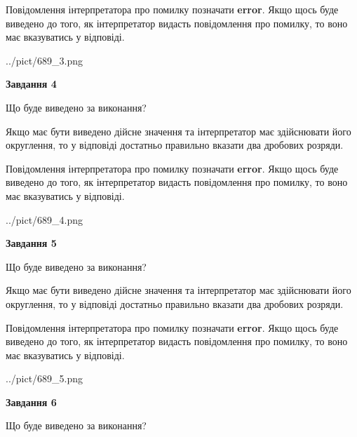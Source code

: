 \documentclass[12pt, ukrainian]{article}
\begin{document}
{\begin {Large}
Повідомлення інтерпретатора про помилку позначати \textbf{error}.
Якщо щось буде виведено до того, як інтерпретатор видасть повідомлення про помилку, 
то воно має вказуватись у відповіді. \par

\begin{center}
	{../pict/689_3.png}
\end{center}
\newpage

{\begin {center}\textbf{Завдання 4}\end {center}}\par
Що буде виведено за виконання? \par

Якщо має бути виведено дійсне значення та інтерпретатор має здійснювати його округлення, 
то у відповіді достатньо правильно вказати два дробових розряди.

Повідомлення інтерпретатора про помилку позначати \textbf{error}.
Якщо щось буде виведено до того, як інтерпретатор видасть повідомлення про помилку, 
то воно має вказуватись у відповіді. \par

\begin{center}
	{../pict/689_4.png}
\end{center}
\newpage

{\begin {center}\textbf{Завдання 5}\end {center}}\par
Що буде виведено за виконання? \par

Якщо має бути виведено дійсне значення та інтерпретатор має здійснювати його округлення, 
то у відповіді достатньо правильно вказати два дробових розряди.

Повідомлення інтерпретатора про помилку позначати \textbf{error}.
Якщо щось буде виведено до того, як інтерпретатор видасть повідомлення про помилку, 
то воно має вказуватись у відповіді. \par

\begin{center}
	{../pict/689_5.png}
\end{center}
\newpage

{\begin {center}\textbf{Завдання 6}\end {center}}\par
Що буде виведено за виконання? \par


\end{Large}}
\end{document}
